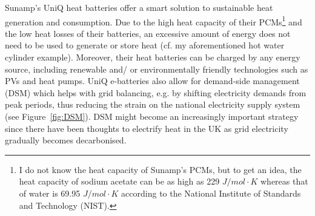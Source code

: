 Sunamp’s UniQ heat batteries offer a smart solution to sustainable heat generation and consumption.
Due to the high heat capacity of their PCMs\footnote{
	I do not know the heat capacity of Sunamp's PCMs, but to get an idea, the heat capacity of sodium acetate can be as high as 229 $J/mol \cdot K$ \citep{Csodiumacetate} whereas that of water is 69.95 $J/mol \cdot K$ \citep{Cwater} according to the National Institute of Standards and Technology (NIST).
} and the low heat losses of their batteries, an excessive amount of energy does not need to be used to generate or store heat (cf. my aforementioned hot water cylinder example).
Moreover, their heat batteries can be charged by any energy source, including renewable and/ or environmentally friendly technologies such as PVs and heat pumps. %
UniQ e-batteries also allow for demand-side management (DSM) which helps with grid balancing, e.g. by shifting electricity demands from peak periods, thus reducing the strain on the national electricity supply system (see Figure~\ref{fig:DSM}).
DSM might become an increasingly important strategy since there have been thoughts to electrify heat in the UK as grid electricity gradually becomes decarbonised.




